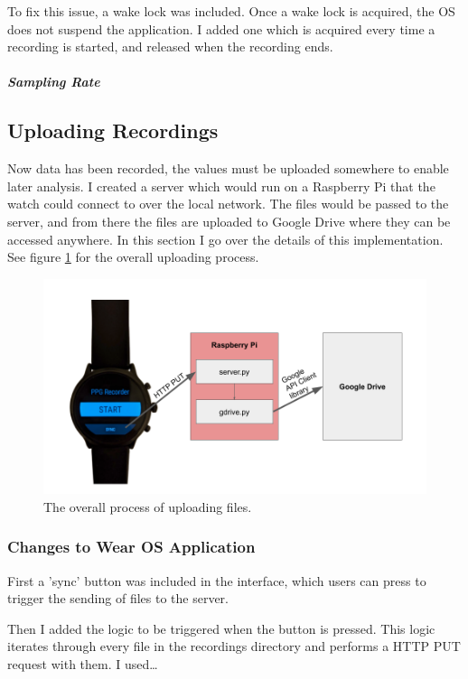 \documentclass[12pt,a4paper,twoside,openright]{report}
\begin{document}
To fix this issue, a wake lock was included. Once a wake lock is acquired, the
OS does not suspend the application. I added one which is acquired every time
a recording is started, and released when the recording ends.

\subparagraph{Sampling Rate}


\subsection{Uploading Recordings}

Now data has been recorded, the values must be uploaded somewhere to enable
later analysis. I created a server which would run on a Raspberry Pi that the
watch could connect to over the local network. The files would be passed to
the server, and from there the files are uploaded to Google Drive where they
can be accessed anywhere. In this section I go over the details of this
implementation. See figure \ref{fig:upload} for the overall uploading process.

\begin{figure}[tbh]
	\centerline{\includegraphics[width=\textwidth]{figs/upload.png}}
	\caption{The overall process of uploading files.}
	\label{fig:upload}
\end{figure}

\subsubsection{Changes to Wear OS Application}

First a 'sync' button was included in the interface, which users can press to
trigger the sending of files to the server.

Then I added the logic to be triggered when the button is pressed. This logic
iterates through every file in the recordings directory and performs a HTTP
PUT request with them. I used\ldots
\end{document}
